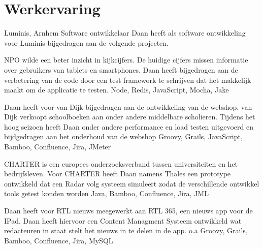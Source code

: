 \section*{Werkervaring}
	\begin{workExperience}{Luminis, Arnhem}%
	{Software ontwikkelaar}{}	
		Daan heeft als software ontwikkeling voor Luminis bijgedragen aan de
		volgende projecten.
                
                NPO wilde een beter inzicht in kijkcijfers. De huidige
                cijfers missen informatie over gebruikers van tablets
                en smartphones. Daan heeft bijgedragen aan de
                verbetering van de code door een test framework te
                schrijven dat het makkelijk maakt om de applicatie te
                testen.
                \technics Node, Redis, JavaScript, Mocha, Jake

                Daan heeft voor van Dijk bijgedragen aan de
                ontwikkeling van de webshop. van Dijk verkoopt
                schoolboeken aan onder andere middelbare
                scholieren. Tijdens het hoog seizoen heeft Daan onder
                andere performance en load testen uitgevoerd en
                bijdgedragen aan het onderhoud van de webshop
                \technics Groovy, Grails, JavaScript, Bamboo,
                Confluence, Jira, JMeter

                CHARTER is een europees onderzoeksverband tussen
                universiteiten en het bedrijfsleven. Voor CHARTER
                heeft Daan namens Thales een prototype ontwikkeld dat
                een Radar volg systeem simuleert zodat de
                verschillende ontwikkel tools getest konden worden
                \technics Java, Bamboo, Confluence, Jira, JML

                Daan heeft voor RTL nieuws meegewerkt aan RTL 365, een
                nieuws app voor de IPad. Daan heeft hiervoor een
                Content Managment Systeem ontwikkeld wat redacteuren
                in staat stelt het nieuws in te delen in de app.
                \technics o.a Groovy, Grails, Bamboo, Confluence,
                Jira, MySQL
	\end{workExperience}

